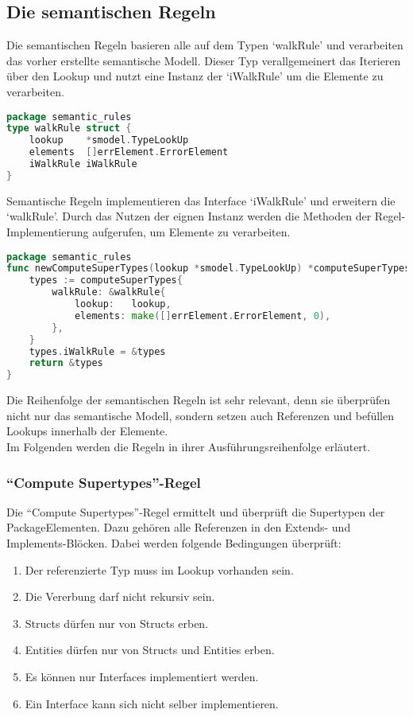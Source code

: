 \documentclass[./einleitung.tex]{subfiles}
\begin{document}
    \subsection{Die semantischen Regeln}\label{subsec:die-semantischen-regeln}
    Die semantischen Regeln basieren alle auf dem Typen `walkRule' und verarbeiten das vorher erstellte semantische Modell.
    Dieser Typ verallgemeinert das Iterieren über den Lookup und nutzt eine Instanz der `iWalkRule' um die Elemente zu verarbeiten.
    \begin{lstlisting}[language=go]
package semantic_rules
type walkRule struct {
	lookup    *smodel.TypeLookUp
	elements  []errElement.ErrorElement
	iWalkRule iWalkRule
}
    \end{lstlisting}
    Semantische Regeln implementieren das Interface `iWalkRule' und erweitern die `walkRule'.
    Durch das Nutzen der eignen Instanz werden die Methoden der Regel-Implementierung aufgerufen, um Elemente zu verarbeiten.
    \begin{lstlisting}[language=go]
package semantic_rules
func newComputeSuperTypes(lookup *smodel.TypeLookUp) *computeSuperTypes {
	types := computeSuperTypes{
		walkRule: &walkRule{
			lookup:   lookup,
			elements: make([]errElement.ErrorElement, 0),
		},
	}
    types.iWalkRule = &types
    return &types
}\end{lstlisting}

    Die Reihenfolge der semantischen Regeln ist sehr relevant, denn sie überprüfen nicht nur das semantische Modell, sondern setzen auch Referenzen und befüllen Lookups innerhalb der Elemente. \\
    Im Folgenden werden die Regeln in ihrer Ausführungsreihenfolge erläutert.

    \subsubsection{``Compute Supertypes''-Regel}
    Die ``Compute Supertypes''-Regel ermittelt und überprüft die Supertypen der PackageElementen.
    Dazu gehören alle Referenzen in den Extends- und Implements-Blöcken.
    Dabei werden folgende Bedingungen überprüft:
    \begin{enumerate}
        \item Der referenzierte Typ muss im Lookup vorhanden sein.
        \item Die Vererbung darf nicht rekursiv sein.
        \item Structs dürfen nur von Structs erben.
        \item Entities dürfen nur von Structs und Entities erben.
        \item Es können nur Interfaces implementiert werden.
        \item Ein Interface kann sich nicht selber implementieren.
    \end{enumerate}
\end{document}
